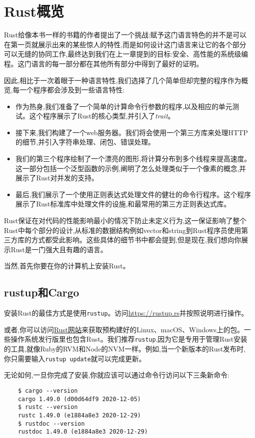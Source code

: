 \chapter{Rust概览}\label{ch02}
Rust给像本书一样的书籍的作者提出了一个挑战:赋予这门语言特色的并不是可以在第一页就展示出来的某些惊人的特性,而是如何设计这门语言来让它的各个部分可以无缝的协同工作,最终达到我们在上一章提到的目标:安全、高性能的系统级编程。这门语言的每一部分都在其他所有部分中得到了最好的证明。

因此,相比于一次着眼于一种语言特性,我们选择了几个简单但却完整的程序作为概览,每一个程序都会涉及到一些语言特性:

\begin{itemize}
    \item 作为热身,我们准备了一个简单的计算命令行参数的程序,以及相应的单元测试。这个程序展示了Rust的核心类型,并引入了\emph{trait}。
    \item 接下来,我们构建了一个web服务器。我们将会使用一个第三方库来处理HTTP的细节,并引入字符串处理、闭包、错误处理。
    \item 我们的第三个程序绘制了一个漂亮的图形,将计算分布到多个线程来提高速度。这一部分包括一个泛型函数的示例,阐明了怎么处理类似于一个像素的概念,并展示了Rust对并发的支持。
    \item 最后,我们展示了一个使用正则表达式处理文件的健壮的命令行程序。这个程序展示了Rust标准库中处理文件的设施,和最常用的第三方正则表达式库。
\end{itemize}

Rust保证在对代码的性能影响最小的情况下防止未定义行为,这一保证影响了整个Rust中每个部分的设计,从标准的数据结构例如vector和string到Rust程序员使用第三方库的方式都受此影响。这些具体的细节书中都会提到,但是现在,我们想向你展示Rust是一门强大且有趣的语言。

当然,首先你要在你的计算机上安装Rust。

\section{rustup和Cargo}
安装Rust的最佳方式是使用\texttt{rustup}。访问\url{https://rustup.rs}并按照说明进行操作。

或者,你可以访问\href{https://www.rust-lang.org/}{Rust网站}来获取预构建好的Linux、macOS、Windows上的包。一些操作系统发行版里也包含Rust。我们推荐\texttt{rustup},因为它是专用于管理Rust安装的工具,就像Ruby的RVM和Node的NVM一样。例如,当一个新版本的Rust发布时,你只需要输入\texttt{rustup update}就可以完成更新。

无论如何,一旦你完成了安装,你就应该可以通过命令行访问以下三条新命令:
\begin{verbatim}
    $ cargo --version
    cargo 1.49.0 (d00d64df9 2020-12-05)
    $ rustc --version
    rustc 1.49.0 (e1884a8e3 2020-12-29)
    $ rustdoc --version
    rustdoc 1.49.0 (e1884a8e3 2020-12-29)
\end{verbatim}

